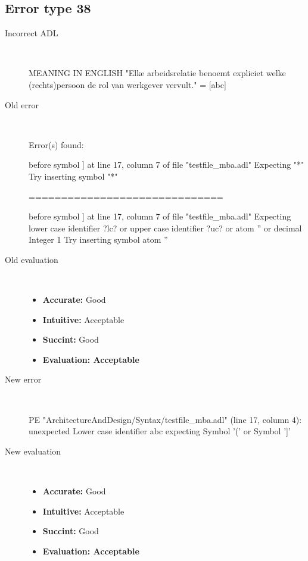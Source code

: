 \hrulefill

\subsection{Error type 38}
  \begin{description}
  \item[Incorrect ADL]~\\
\begin{adl}
MEANING IN ENGLISH "Elke arbeidsrelatie benoemt expliciet welke (rechts)persoon de rol van werkgever vervult."
= [abc]\end{adl}
  \item[Old error]~\\
\begin{haskell}
Error(s) found:

before symbol ] at line 17, column 7 of file "testfile_mba.adl"
Expecting "*"
Try inserting symbol "*"

==============================

before symbol ] at line 17, column 7 of file "testfile_mba.adl"
Expecting lower case identifier ?lc? or upper case identifier ?uc? or atom '' or
 decimal Integer 1
Try inserting symbol atom ''
\end{haskell}
  \item[Old evaluation]~\\
    \begin{itemize}
    \item \textbf{Accurate:} Good
    \item \textbf{Intuitive:} Acceptable
    \item \textbf{Succint:} Good
    \item \textbf{Evaluation: Acceptable}
    \end{itemize}
  \item[New error]~\\
\begin{haskell}
PE "ArchitectureAndDesign/Syntax/testfile_mba.adl" (line 17, column 4):
unexpected Lower case identifier abc
expecting Symbol '(' or Symbol ']'\end{haskell}
  \item[New evaluation]~\\
    \begin{itemize}
    \item \textbf{Accurate:} Good
    \item \textbf{Intuitive:} Acceptable
    \item \textbf{Succint:} Good
    \item \textbf{Evaluation: Acceptable
}
    \end{itemize}
  \end{description}

